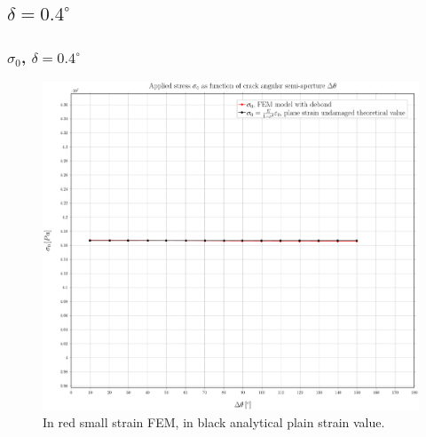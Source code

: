 \documentclass[first,firstsupp,lastsupp,handout,last,hyperref,table]{ETHclass}
\begin{document}

\subsection{$\delta=0.4^{\circ}$}

\begin{frame}
\frametitle{\small $\sigma_{0}$, $\delta=0.4^{\circ}$}
\vspace{-0.5cm}
\centering
\captionsetup[figure]{font=scriptsize,labelfont=scriptsize}
\begin{figure}[!h]
\centering
\includegraphics[height=0.7\textheight]{2017-07-10_AbqRunSummary_SmallStrainD04_sigma-inf_Summary.pdf}
  \caption{\scriptsize In red small strain FEM, in black analytical plain strain value.}
  \label{fig:res1}
\end{figure}
\end{frame}
\end{document}
